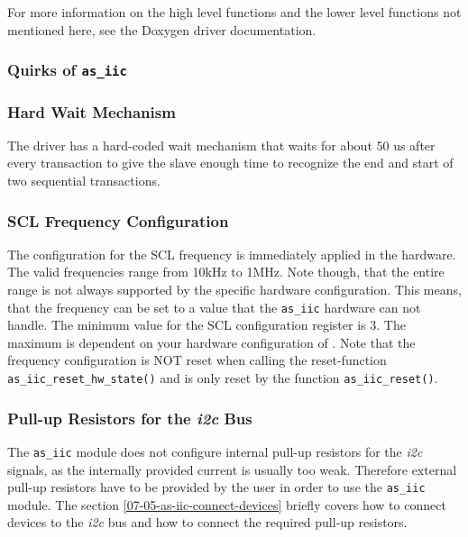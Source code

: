 For more information on the high level functions and the lower level functions not mentioned here, see the \asterics Doxygen driver documentation.


\subsubsection{Quirks of \texttt{as\_iic}} \label{07-05-04-as-iic-quirks}

\subsubsection*{Hard Wait Mechanism}

The driver has a hard-coded wait mechanism that waits for about 50 us after every transaction to give the slave enough time to recognize the end and start of two sequential transactions.  

\subsubsection*{SCL Frequency Configuration}

The configuration for the SCL frequency is immediately applied in the hardware. 
The valid frequencies range from 10kHz to 1MHz. Note though, that the entire range is not always supported by the specific hardware configuration.
This means, that the frequency can be set to a value that the \texttt{as\_iic} hardware can not handle.
The minimum value for the SCL configuration register is 3.
The maximum is dependent on your hardware configuration of \asterics.
Note that the frequency configuration is NOT reset when calling the reset-function \texttt{as\_iic\_reset\_hw\_state()} and is only reset by the function \texttt{as\_iic\_reset()}.

\subsubsection*{Pull-up Resistors for the \textit{i2c} Bus}

The \texttt{as\_iic} module does not configure internal pull-up resistors for the \textit{i2c} signals, as the internally provided current is usually too weak. Therefore external pull-up resistors have to be provided by the user in order to use the \texttt{as\_iic} module.
The section \ref{07-05-as-iic-connect-devices} briefly covers how to connect devices to the \textit{i2c} bus and how to connect the required pull-up resistors.

